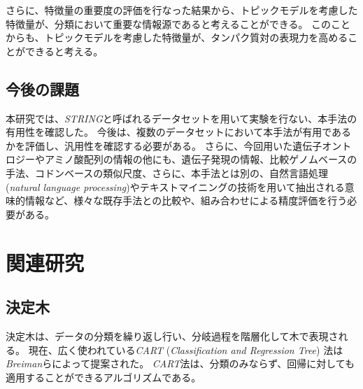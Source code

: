 \documentclass[titlepage,12pt]{jreport}
\begin{document}
さらに、特徴量の重要度の評価を行なった結果から、トピックモデルを考慮した特徴量が、分類において重要な情報源であると考えることができる。 このことからも、トピックモデルを考慮した特徴量が、タンパク質対の表現力を高めることができると考える。

\section{今後の課題\label{future-works}}
本研究では、{\it STRING}と呼ばれるデータセットを用いて実験を行ない、本手法の有用性を確認した。 今後は、複数のデータセットにおいて本手法が有用であるかを評価し、汎用性を確認する必要がある。 さらに、今回用いた遺伝子オントロジーやアミノ酸配列の情報の他にも、遺伝子発現の情報\cite{gene-expression08}、比較ゲノムベースの手法\cite{hikaku09}、コドンベースの類似尺度\cite{codon08}、さらに、本手法とは別の、自然言語処理 ({\it natural language processing})やテキストマイニングの技術を用いて抽出される意味的情報\cite{txt-mining10}など、様々な既存手法との比較や、組み合わせによる精度評価を行う必要がある。




\chapter{関連研究\label{reference}}
\section{決定木}
決定木は、データの分類を繰り返し行い、分岐過程を階層化して木で表現される。 現在、広く使われている{\it CART} ({\it Classification and Regression Tree}) 法は{\it Breiman}らによって提案された\cite{decision-tree}。 {\it CART}法は、分類のみならず、回帰に対しても適用することができるアルゴリズムである。
\end{document}
